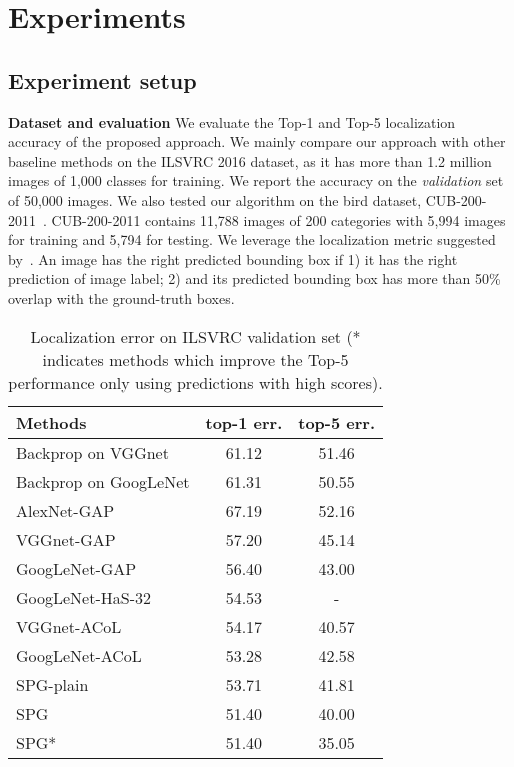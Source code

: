 \documentclass[runningheads]{llncs}
\begin{document}
 \section{Experiments}\label{exper}
\subsection{Experiment setup}
\textbf{Dataset and evaluation}
We evaluate the Top-1 and Top-5 localization accuracy of the proposed approach.
We mainly compare our approach with other baseline methods on the ILSVRC 2016 dataset, as it has more than 1.2 million images of 1,000 classes for training.
We report the accuracy on the \textit{validation} set of 50,000 images.
We also tested our algorithm on the bird dataset, CUB-200-2011~\cite{WahCUB_200_2011}.
CUB-200-2011 contains 11,788 images of 200 categories with 5,994 images for training and 5,794 for testing.
We leverage the localization metric suggested by~\cite{ILSVRC15}.
An image has the right predicted bounding box if 1) it has the right prediction of image label; 2) and its predicted bounding box has more than 50\% overlap with the ground-truth boxes.

\begin{table}[t]\setlength{\tabcolsep}{10pt}
  \centering
\caption{Localization error on ILSVRC validation set (* indicates methods which improve the Top-5 performance only using predictions with high scores).}\label{tab3}
  \begin{tabular}{l|c|c}
    \hline
    \hline
Methods & top-1 err. & top-5 err. \\
    \hline
     Backprop on VGGnet \cite{simonyan2013deep} & 61.12 & 51.46 \\
     Backprop on GoogLeNet \cite{simonyan2013deep} & 61.31 & 50.55 \\
     AlexNet-GAP \cite{zhou2015cnnlocalization} & 67.19 & 52.16 \\
     VGGnet-GAP \cite{zhou2015cnnlocalization} & 57.20 & 45.14 \\
     GoogLeNet-GAP \cite{zhou2015cnnlocalization} & 56.40 & 43.00 \\
     GoogLeNet-HaS-32 \cite{singh2017hide} & 54.53 & - \\
     VGGnet-ACoL \cite{zhang2018adversarial} & 54.17 & 40.57 \\
     GoogLeNet-ACoL \cite{zhang2018adversarial} & 53.28 & 42.58 \\
    \hline
     SPG-plain & 53.71 & 41.81 \\
     SPG & 51.40 & 40.00 \\
     SPG* & 51.40 & 35.05 \\
    \hline
    \hline
  \end{tabular}
\end{table}
\end{document}
